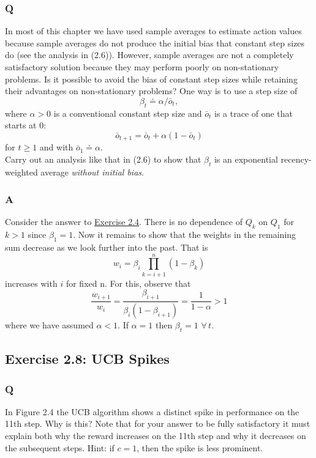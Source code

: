 \subsubsection{Q}
In most of this chapter we have used sample averages to estimate action values because sample averages do not produce the initial bias that constant step sizes do (see the analysis in (2.6)). However, sample averages are not a completely satisfactory solution because they may perform poorly on non-stationary problems. Is it possible to avoid the bias of constant step sizes while retaining their advantages on non-stationary problems? One way is to use a step size of
\begin{equation}
    \beta_t \doteq \alpha / \bar{o}_t,
\end{equation}
where $\alpha > 0$ is a conventional constant step size and $\bar{o}_t$ is a trace of one that starts at 0:
\begin{equation}
    \bar{o}_{t+1} = \bar{o}_t + \alpha (1 - \bar{o}_t)
\end{equation}
for $t \geq 1$ and with $\bar{o}_1 \doteq \alpha$.\\

Carry out an analysis like that in (2.6) to show that $\beta_t$ is an exponential recency-weighted average \emph{without initial bias}. 

\subsubsection{A}
Consider the answer to \hyperref[ex:2.4]{Exercise 2.4}. There is no dependence of $Q_k$ on $Q_1$ for $k > 1$ since $\beta_1 = 1$. Now it remains to show that the weights in the remaining sum decrease as we look further into the past. That is
\begin{equation}
    w_i = \beta_i \prod_{k = i + 1}^{n} (1 - \beta_k)
\end{equation}
increases with $i$ for fixed n. For this, observe that
\begin{equation}
    \frac{w_{i+1}}{w_i} = \frac{\beta_{i+1}}{\beta_i(1 - \beta_{i + 1})} = \frac{1}{1 - \alpha} > 1
\end{equation} 
where we have assumed $\alpha < 1$. If $\alpha = 1$ then $\beta_t = 1 \,\, \forall \, t$.

\subsection{Exercise 2.8: UCB Spikes}
\subsubsection{Q}
In Figure 2.4 the UCB algorithm shows a distinct spike in performance on the 11th step. Why is this? Note that for your answer to be fully satisfactory it must explain both why the reward increases on the 11th step and why it decreases on the subsequent steps. Hint: if $c = 1$, then the spike is less prominent.

